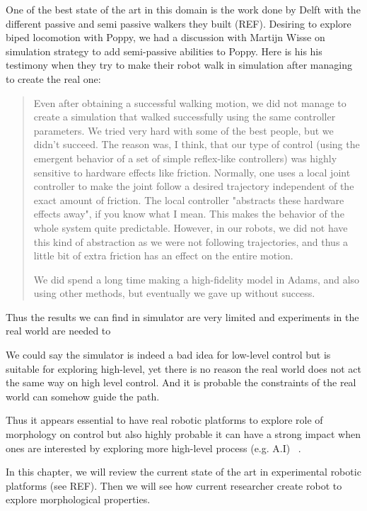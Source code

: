 One of the best state of the art in this domain is the work done by Delft with the different passive and semi passive walkers they built (REF). Desiring to explore biped locomotion with Poppy, we had a discussion with Martijn Wisse on simulation strategy to add semi-passive abilities to Poppy. Here is his his testimony when they try to make their robot walk in simulation after managing to create the real one:

\begin{quotation}

Even after obtaining a successful walking motion, we did not manage to create a simulation that walked successfully using the same controller parameters. We tried very hard with some of the best people, but we didn’t succeed. The reason was, I think, that our type of control (using the emergent behavior of a set of simple reflex-like controllers) was highly sensitive to hardware effects like friction. Normally, one uses a local joint controller to make the joint follow a desired trajectory independent of the exact amount of friction. The local controller "abstracts these hardware effects away", if you know what I mean. This makes the behavior of the whole system quite predictable. However, in our robots, we did not have this kind of abstraction as we were not following trajectories, and thus a little bit of extra friction has an effect on the entire motion.

We did spend a long time making a high-fidelity model in Adams, and also using other methods, but eventually we gave up without success.

\end{quotation}

Thus the results we can find in simulator are very limited and experiments in the real world are needed to

We could say the simulator is indeed a bad idea for low-level control but is suitable for exploring high-level, yet there is no reason the real world does not act the same way on high level control. And it is probable the constraints of the real world can somehow guide the path.

Thus it appears essential to have real robotic platforms to explore role of morphology on control but also highly probable it can have a strong impact when ones are interested by exploring more high-level process (e.g. A.I) ~\parencite{lakoff2000mathematics}.


In this chapter, we will review the current state of the art in experimental robotic platforms (see REF). Then we will see how current researcher create robot to explore morphological properties.

